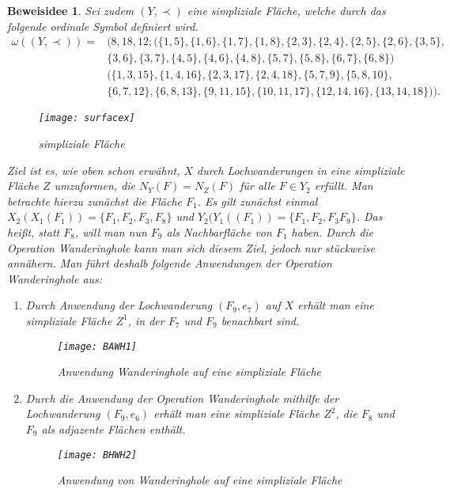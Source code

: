 \documentclass[12pt,titlepage,twoside,cleardoublepage]{article}
\theoremstyle{nummermitklammern}
\newtheorem{beweisidee}[temp]{Beweisidee}
\newtheorem{beweisidee}[zahl]{Beweisidee}
\numberwithin{equation}{section}
\begin{document}
\begin{beweisidee}
Sei zudem $(Y,\prec)$ eine simpliziale Fläche, welche durch das folgende ordinale Symbol definiert wird.
\begin{align*}
\omega((Y,\prec))=&(8,18,12;(\{1,5\},\{1,6\},\{ 1, 7 \}, \{ 1, 8 \}, \{ 2, 3 \}, \{ 2, 4 \}, \{ 2, 5 \},\{ 2, 6 \}, \{ 3, 5 \}, \\
&\{ 3, 6 \}, \{ 3, 7 \}, \{ 4, 5 \}, \{ 4, 6 \}, \{ 4, 8 \},
  \{ 5, 7 \}, \{ 5, 8 \}, \{ 6, 7 \}, \{ 6, 8 \}) \\
 &(\{ 1, 3, 15 \}, \{ 1, 4, 16 \}, \{ 2, 3, 17 \}, \{ 2, 4, 18 \}, \{ 5, 7, 9 \},  \{ 5, 8, 10 \},\\ 
  &\{ 6, 7, 12 \}, \{ 6, 8, 13 \}, \{ 9, 11, 15 \}, \{ 10, 11, 17 \},
  \{ 12, 14, 16 \}, \{ 13, 14, 18 \} )).
\end{align*}

\begin{figure}[H]
\begin{center}
\texttt{[image: surfacex]}
\end{center}
\caption{simpliziale Fläche}
\end{figure}
Ziel ist es, wie oben schon erwähnt, $X$ durch Lochwanderungen in eine simpliziale Fläche $Z$ umzuformen, die $N_Y(F)=N_Z(F)$ für alle $F \in Y_2$ erfüllt. Man betrachte hierzu zunächst die Fläche $F_1$. Es gilt zunächst einmal $X_2(X_1(F_1))=\{F_1,F_2,F_3,F_8\}$ und $Y_2(Y_1((F_1))=\{F_1,F_2,F_3F_9\}$. Das heißt, statt $F_8$, will man nun $F_9$ als Nachbarfläche von $F_1$ haben. Durch die Operation Wanderinghole kann man sich diesem Ziel, jedoch nur stückweise annähern. Man führt deshalb folgende Anwendungen der Operation Wanderinghole aus:
\begin{enumerate}
\item Durch Anwendung der Lochwanderung $(F_9,e_7)$ auf $X$ erhält man eine simpliziale Fläche $Z^1$, in der $F_7$ und $F_9$ benachbart sind.
\begin{figure}[H]
\begin{center}
\texttt{[image: BAWH1]}
\end{center}
\caption{Anwendung Wanderinghole auf eine simpliziale Fläche}
\end{figure}

\item Durch die Anwendung der Operation Wanderinghole mithilfe der Lochwanderung $(F_9,e_6)$ erhält man eine simpliziale Fläche $Z^2$, die $F_8$ und $F_9$ als adjazente Flächen enthält.
\begin{figure}[H]
\begin{center}
\texttt{[image: BHWH2]}
\end{center}
\caption{Anwendung von Wanderinghole auf eine simpliziale Fläche}
\end{figure}


\end{enumerate}
\end{beweisidee}
\end{document}
